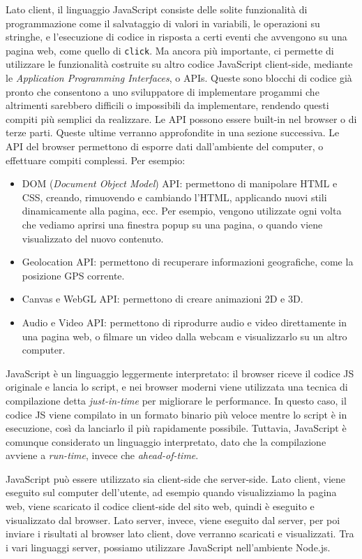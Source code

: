 Lato client, il linguaggio JavaScript consiste delle solite funzionalità di programmazione come il salvataggio di valori in variabili, le operazioni su stringhe, e l'esecuzione di codice in risposta a certi eventi che avvengono su una pagina web, come quello di \Verb_click_. Ma ancora più importante, ci permette di utilizzare le funzionalità costruite su altro codice JavaScript client-side, mediante le \textit{Application Programming Interfaces}, o APIs. Queste sono blocchi di codice già pronto che consentono a uno sviluppatore di implementare progammi che altrimenti sarebbero difficili o impossibili da implementare, rendendo questi compiti più semplici da realizzare. Le API possono essere built-in nel browser o di terze parti. Queste ultime verranno approfondite in una sezione successiva. Le API del browser permettono di esporre dati dall'ambiente del computer, o effettuare compiti complessi. Per esempio:
\begin{itemize}
    \item DOM (\textit{Document Object Model}) API: permettono di manipolare HTML e CSS, creando, rimuovendo e cambiando l'HTML, applicando nuovi stili dinamicamente alla pagina, ecc. Per esempio, vengono utilizzate ogni volta che vediamo aprirsi una finestra popup su una pagina, o quando viene visualizzato del nuovo contenuto.
    \item Geolocation API: permettono di recuperare informazioni geografiche, come la posizione GPS corrente.
    \item Canvas e WebGL API: permettono di creare animazioni 2D e 3D.
    \item Audio e Video API: permettono di riprodurre audio e video direttamente in una pagina web, o filmare un video dalla webcam e visualizzarlo su un altro computer.
\end{itemize}

JavaScript è un linguaggio leggermente interpretato: il browser riceve il codice JS originale e lancia lo script, e nei browser moderni viene utilizzata una tecnica di compilazione detta \textit{just-in-time} per migliorare le performance. In questo caso, il codice JS viene compilato in un formato binario più veloce mentre lo script è in esecuzione, così da lanciarlo il più rapidamente possibile. Tuttavia, JavaScript è comunque considerato un linguaggio interpretato, dato che la compilazione avviene a \textit{run-time}, invece che \textit{ahead-of-time}.

JavaScript può essere utilizzato sia client-side che server-side. Lato client, viene eseguito sul computer dell'utente, ad esempio quando visualizziamo la pagina web, viene scaricato il codice client-side del sito web, quindi è eseguito e visualizzato dal browser. Lato server, invece, viene eseguito dal server, per poi inviare i risultati al browser lato client, dove verranno scaricati e visualizzati. Tra i vari linguaggi server, possiamo utilizzare JavaScript nell'ambiente Node.js.

